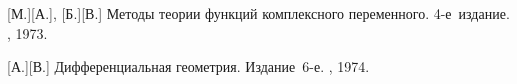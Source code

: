 \begin{thebibliography}{123}
\begin{otherlanguage}{russian}
[М.][А.],
[Б.][В.]
Методы теории функций комплексного переменного.
4\hbox{-}е~издание.
\naukapublisher,
1973.

[А.][В.]
Дифференциальная геометрия.
Издание~6\hbox{-}е.
\naukapublisher,
1974.

\end{otherlanguage}

\normalsize
\end{thebibliography}
